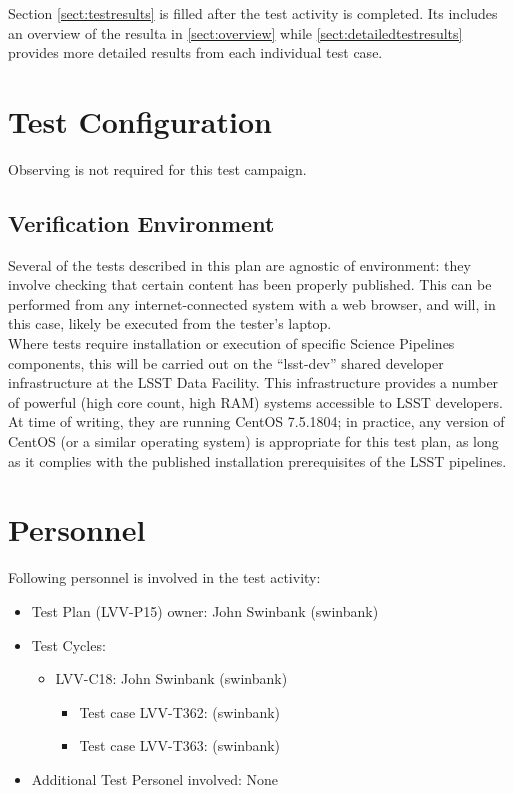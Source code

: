 \documentclass[DM,lsstdraft,STR,toc]{lsstdoc}
\begin{document}
Section \ref{sect:testresults} is filled after the test activity is completed.
Its includes  an overview of the resulta in \ref{sect:overview}
while \ref{sect:detailedtestresults} provides more detailed results from each individual test case.

\newpage
\section{Test Configuration}
\label{sect:configuration}

Observing is not required for this test campaign.


\subsection{Verification Environment}
\label{sect:hwconf}
Several of the tests described in this plan are agnostic of environment:
they involve checking that certain content has been properly published.
This can be performed from any internet-connected system with a web
browser, and will, in this case, likely be executed from the tester's
laptop.\\[2\baselineskip]Where tests require installation or execution
of specific Science Pipelines components, this will be carried out on
the ``lsst-dev'' shared developer infrastructure at the LSST Data
Facility. This infrastructure provides a number of powerful (high core
count, high RAM) systems accessible to LSST developers. At time of
writing, they are running CentOS 7.5.1804; in practice, any version of
CentOS (or a similar operating system) is appropriate for this test
plan, as long as it complies with the published installation
prerequisites of the LSST pipelines.\\[2\baselineskip]





\newpage
\section{Personnel}
\label{sect:personnel}

Following personnel is involved in the test activity:

\begin{itemize}
\item Test Plan (LVV-P15) owner: John Swinbank (swinbank)
\item Test Cycles:
\begin{itemize}
  \item LVV-C18: John Swinbank (swinbank)
  \begin{itemize}
    \item Test case LVV-T362:  (swinbank)
    \item Test case LVV-T363:  (swinbank)
  \end{itemize}
\end{itemize}
\item Additional Test Personel involved: None
\end{itemize}
\end{document}
